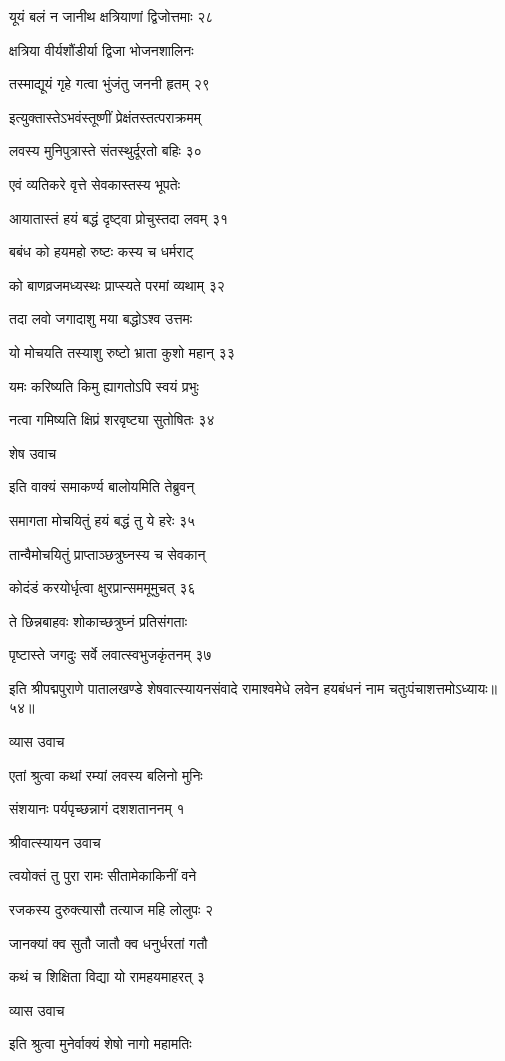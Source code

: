 यूयं बलं न जानीथ क्षत्रियाणां द्विजोत्तमाः २८

क्षत्रिया वीर्यशौंडीर्या द्विजा भोजनशालिनः

तस्माद्यूयं गृहे गत्वा भुंजंतु जननी हृतम् २९

इत्युक्तास्तेऽभवंस्तूष्णीं प्रेक्षंतस्तत्पराक्रमम्

लवस्य मुनिपुत्रास्ते संतस्थुर्दूरतो बहिः ३०

एवं व्यतिकरे वृत्ते सेवकास्तस्य भूपतेः

आयातास्तं हयं बद्धं दृष्ट्वा प्रोचुस्तदा लवम् ३१

बबंध को हयमहो रुष्टः कस्य च धर्मराट्

को बाणव्रजमध्यस्थः प्राप्स्यते परमां व्यथाम् ३२

तदा लवो जगादाशु मया बद्धोऽश्व उत्तमः

यो मोचयति तस्याशु रुष्टो भ्राता कुशो महान् ३३

यमः करिष्यति किमु ह्यागतोऽपि स्वयं प्रभुः

नत्वा गमिष्यति क्षिप्रं शरवृष्ट्या सुतोषितः ३४

शेष उवाच

इति वाक्यं समाकर्ण्य बालोयमिति तेब्रुवन्

समागता मोचयितुं हयं बद्धं तु ये हरेः ३५

तान्वैमोचयितुं प्राप्ताञ्छत्रुघ्नस्य च सेवकान्

कोदंडं करयोर्धृत्वा क्षुरप्रान्सममूमुचत् ३६

ते छिन्नबाहवः शोकाच्छत्रुघ्नं प्रतिसंगताः

पृष्टास्ते जगदुः सर्वे लवात्स्वभुजकृंतनम् ३७

इति श्रीपद्मपुराणे पातालखण्डे शेषवात्स्यायनसंवादे रामाश्वमेधे लवेन हयबंधनं नाम चतुःपंचाशत्तमोऽध्यायः॥५४॥


व्यास उवाच

एतां श्रुत्वा कथां रम्यां लवस्य बलिनो मुनिः

संशयानः पर्यपृच्छन्नागं दशशताननम् १

श्रीवात्स्यायन उवाच

त्वयोक्तं तु पुरा रामः सीतामेकाकिनीं वने

रजकस्य दुरुक्त्यासौ तत्याज महि लोलुपः २

जानक्यां क्व सुतौ जातौ क्व धनुर्धरतां गतौ

कथं च शिक्षिता विद्या यो रामहयमाहरत् ३

व्यास उवाच

इति श्रुत्वा मुनेर्वाक्यं शेषो नागो महामतिः

